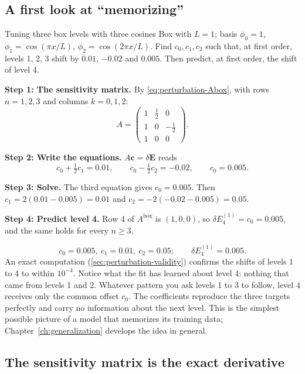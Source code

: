 \subsection{A first look at ``memorizing''}

\begin{sample}{Tuning three box levels with three cosines}
Box with $L=1$; basis $\phi_0=1$, $\phi_1=\cos(\pi x/L)$, $\phi_2=\cos(2\pi x/L)$. Find $c_0,c_1,c_2$ such that, at first order, levels 1, 2, 3 shift by $0.01$, $-0.02$ and $0.005$. Then predict, at first order, the shift of level 4.

\textbf{Step 1: The sensitivity matrix.} By \cref{eq:perturbation-Abox}, with rows $n=1,2,3$ and columns $k=0,1,2$:
\[
A=\begin{pmatrix}1&\tfrac12&0\\[2pt]1&0&-\tfrac12\\[2pt]1&0&0\end{pmatrix}.
\]

\textbf{Step 2: Write the equations.} $A\bm c=\delta\bm E$ reads
\[
c_0+\tfrac12c_1=0.01,\qquad c_0-\tfrac12c_2=-0.02,\qquad c_0=0.005 .
\]

\textbf{Step 3: Solve.} The third equation gives $c_0=0.005$. Then $c_1=2(0.01-0.005)=0.01$ and $c_2=-2(-0.02-0.005)=0.05$.

\textbf{Step 4: Predict level 4.} Row 4 of $A^{\text{box}}$ is $(1,0,0)$, so $\delta E_4^{(1)}=c_0=0.005$, and the same holds for every $n\ge3$.

\[
\boxed{c_0=0.005,\ c_1=0.01,\ c_2=0.05;\qquad \delta E_4^{(1)}=0.005.}
\]
An exact computation (\cref{sec:perturbation-validity}) confirms the shifts of levels 1 to 4 to within $10^{-4}$. Notice what the fit has learned about level 4: nothing that came from levels 1 and 2. Whatever pattern you ask levels 1 to 3 to follow, level 4 receives only the common offset $c_0$. The coefficients reproduce the three targets perfectly and carry no information about the next level. This is the simplest possible picture of a model that memorizes its training data; Chapter~\ref{ch:generalization} develops the idea in general.
\end{sample}

\subsection{The sensitivity matrix is the exact derivative}

